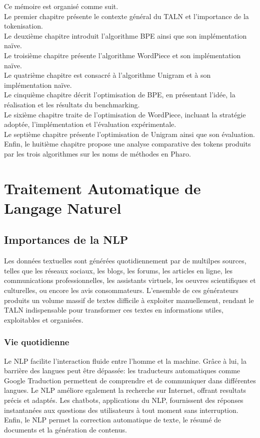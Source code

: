 \documentclass[12pt,a4paper]{report}
\begin{document}
	Ce mémoire est organisé comme suit.\\
	Le premier chapitre présente le contexte général du TALN et l’importance de la tokenisation.\\
	Le deuxième chapitre introduit l’algorithme BPE ainsi que son implémentation naïve.\\
	Le troisième chapitre présente l’algorithme WordPiece et son implémentation naïve.\\
	Le quatrième chapitre est consacré à l’algorithme Unigram et à son implémentation naïve.\\
	Le cinquième chapitre décrit l’optimisation de BPE, en présentant l’idée, la réalisation et les résultats du benchmarking.\\
	Le sixième chapitre traite de l’optimisation de WordPiece, incluant la stratégie adoptée, l’implémentation et l’évaluation expérimentale.\\
	Le septième chapitre présente l’optimisation de Unigram ainsi que son évaluation.\\
	Enfin, le huitième chapitre propose une analyse comparative des tokens produits par les trois algorithmes sur les noms de méthodes en Pharo.\\
	
	\chapter{Traitement Automatique de Langage Naturel}
	\section{Importances de la NLP}
	Les données textuelles sont générées quotidiennement par de multilpes sources, telles que les réseaux sociaux, les blogs, les forums, les articles en ligne, les communications professionnelles, les assistants virtuels, les oeuvres scientifiques et culturelles, ou encore les avis consommateurs. L'ensemble de ces générateurs produits un volume massif de textes difficile à exploiter manuellement, rendant le TALN indispensable pour transformer ces textes en informations utiles, exploitables et organisées.
	\subsection{Vie quotidienne}
	Le NLP facilite l'interaction fluide entre l'homme et la machine. Grâce à lui, la barrière des langues peut être dépassée: les traducteurs automatiques comme Google Traduction permettent de comprendre et de communiquer dans différentes langues. Le NLP améliore egalement la recherche sur Internet, offrant resultats précis et adaptés. Les chatbots, applications du NLP, fournissent des réponses instantanées aux questions des utilisateurs à tout moment sans interruption. Enfin, le NLP permet la correction automatique de texte, le résumé de documents et la génération de contenus.
\end{document}
